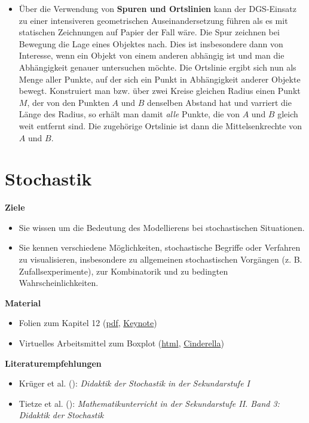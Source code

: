 \documentclass[
]{scrbook}
\providecommand{\tightlist}{%
  \setlength{\itemsep}{0pt}\setlength{\parskip}{0pt}}
\renewenvironment{quote}{
  \list{}{
	\leftmargin0.2cm   %
    \rightmargin\leftmargin
      	\def\FrameCommand
    {%
        {\color{quoteColor}\vrule width 2pt}%
        \hspace{0pt}%
    }%
    \MakeFramed{\advance \hsize -\width \FrameRestore}    \color{quoteColor}
    }
  \item\relax
}
{\endlist\color{black}\endMakeFramed}
\theoremstyle{definition}
\theoremstyle{definition}
\theoremstyle{definition}
\theoremstyle{definition}
\theoremstyle{remark}
\begin{document}
\begin{itemize}
\tightlist
\item
  Über die Verwendung von \textbf{Spuren und Ortslinien} kann der DGS-Einsatz zu einer intensiveren geometrischen Auseinandersetzung führen als es mit statischen Zeichnungen auf Papier der Fall wäre. Die Spur zeichnen bei Bewegung die Lage eines Objektes nach. Dies ist insbesondere dann von Interesse, wenn ein Objekt von einem anderen abhängig ist und man die Abhängigkeit genauer untersuchen möchte. Die Ortslinie ergibt sich nun als Menge aller Punkte, auf der sich ein Punkt in Abhängigkeit anderer Objekte bewegt. Konstruiert man bzw. über zwei Kreise gleichen Radius einen Punkt \(M\), der von den Punkten \(A\) und \(B\) denselben Abstand hat und varriert die Länge des Radius, so erhält man damit \emph{alle} Punkte, die von \(A\) und \(B\) gleich weit entfernt sind. Die zugehörige Ortslinie ist dann die Mittelsenkrechte von \(A\) und \(B\).
\end{itemize}

\chapter{Stochastik}\label{stochastik}

\begin{quote}
\textbf{Ziele}

\begin{itemize}
\tightlist
\item
  Sie wissen um die Bedeutung des Modellierens bei stochastischen Situationen.\\
\item
  Sie kennen verschiedene Möglichkeiten, stochastische Begriffe oder Verfahren zu visualisieren, insbesondere zu allgemeinen stochastischen Vorgängen (z. B. Zufallsexperimente), zur Kombinatorik und zu bedingten Wahrscheinlichkeiten.
\end{itemize}

\textbf{Material}

\begin{itemize}
\tightlist
\item
  Folien zum Kapitel 12 (\href{files/Stoffdidaktik2024-12-Stochastik.pdf}{pdf}, \href{files/Stoffdidaktik2024-12-Stochastik.key}{Keynote})
\item
  Virtuelles Arbeitsmittel zum Boxplot (\href{files/Stoffdidaktik2024-12-Boxplot.html}{html}, \href{files/Stoffdidaktik2024-12-Boxplot.cdy}{Cinderella})
\end{itemize}

\textbf{Literaturempfehlungen}

\begin{itemize}
\tightlist
\item
  Krüger et al. (): \emph{Didaktik der Stochastik in der Sekundarstufe I}
\item
  Tietze et al. (): \emph{Mathematikunterricht in der Sekundarstufe II. Band 3: Didaktik der Stochastik}
\end{itemize}
\end{quote}
\end{document}
